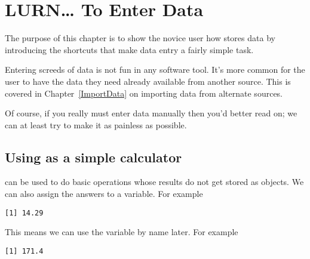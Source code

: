 

\chapter{LURN\ldots{} To Enter Data} 
\label{DataEntry} 
 
 
The purpose of this chapter is to show the novice \R{} user how \R{} stores data by introducing the shortcuts that make data entry a fairly simple task. 
 
Entering screeds of data is not fun in any software tool. It's more common for the \R{} user to have the data they need already available from another source. This is covered in Chapter~\ref{ImportData} on importing data from alternate sources. 
 
Of course, if you really must enter data manually then you'd better read on; we can at least try to make it as painless as possible. 
 
\section{Using \R{} as a simple calculator} 
\label{SimpleCalculator} 
 
\R{} can be used to do basic operations whose results do not get stored as objects. We can also assign the answers to a variable. For example 
\begin{knitrout}
\color{fgcolor}\begin{kframe}
\begin{alltt}
\hlstd{> }\hlkwb{=}\hlopt{/}
\hlstd{> }
\end{alltt}
\begin{verbatim}
[1] 14.29
\end{verbatim}
\end{kframe}
\end{knitrout}
This means we can use the variable by name later. For example 
\begin{knitrout}
\color{fgcolor}\begin{kframe}
\begin{alltt}
\hlstd{> }\hlopt{*}
\end{alltt}
\begin{verbatim}
[1] 171.4
\end{verbatim}
\end{kframe}
\end{knitrout}
 

